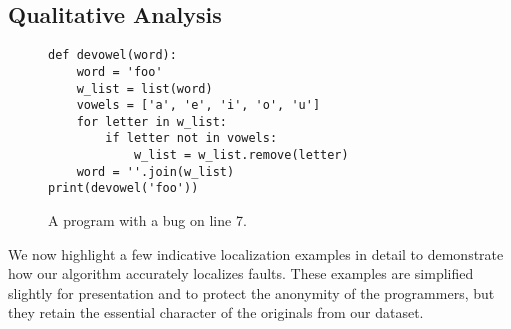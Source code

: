 \documentclass[conference]{IEEEtran}
\begin{document}




\subsection{Qualitative Analysis}

%
%
%
%
%
%

\begin{figure}
\begin{lstlisting}
def devowel(word):
    word = 'foo'
    w_list = list(word)
    vowels = ['a', 'e', 'i', 'o', 'u']
    for letter in w_list:
        if letter not in vowels:
            w_list = w_list.remove(letter)
    word = ''.join(w_list)
print(devowel('foo'))
\end{lstlisting}
\caption{A program with a bug on line 7.}
\label{fig-win-example-one}
\end{figure}


We now highlight a few indicative localization examples in detail to
demonstrate how our algorithm accurately localizes faults.
These examples are simplified slightly for presentation and to protect the
anonymity of the programmers, but they retain the essential character of
the originals from our dataset.
\end{document}

